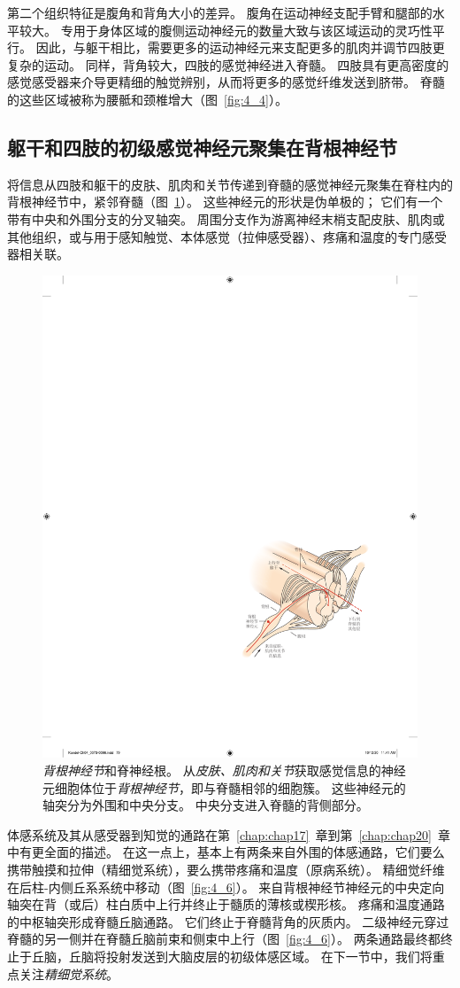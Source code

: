 第二个组织特征是腹角和背角大小的差异。
腹角在运动神经支配手臂和腿部的水平较大。
专用于身体区域的腹侧运动神经元的数量大致与该区域运动的灵巧性平行。
因此，与躯干相比，需要更多的运动神经元来支配更多的肌肉并调节四肢更复杂的运动。
同样，背角较大，四肢的感觉神经进入脊髓。
四肢具有更高密度的感觉感受器来介导更精细的触觉辨别，从而将更多的感觉纤维发送到脐带。
脊髓的这些区域被称为腰骶和颈椎增大（图~\ref{fig:4_4}）。



\subsection{躯干和四肢的初级感觉神经元聚集在背根神经节}

将信息从四肢和躯干的皮肤、肌肉和关节传递到脊髓的感觉神经元聚集在脊柱内的背根神经节中，紧邻脊髓（图~\ref{fig:4_5}）。 
这些神经元的形状是伪单极的；
它们有一个带有中央和外围分支的分叉轴突。
周围分支作为游离神经末梢支配皮肤、肌肉或其他组织，或与用于感知触觉、本体感觉（拉伸感受器）、疼痛和温度的专门感受器相关联。


\begin{figure}[htbp]
	\centering
	\includegraphics[width=0.55\linewidth]{chap04/fig_4_5}
	\caption{\textit{背根神经节}和脊神经根。
		从\textit{皮肤、肌肉和关节}获取感觉信息的神经元细胞体位于\textit{背根神经节}，即与脊髓相邻的细胞簇。
		这些神经元的轴突分为外围和中央分支。 
		中央分支进入脊髓的背侧部分。}
	\label{fig:4_5}
\end{figure}


体感系统及其从感受器到知觉的通路在第~\ref{chap:chap17}~章到第~\ref{chap:chap20}~章中有更全面的描述。
在这一点上，基本上有两条来自外围的体感通路，它们要么携带触摸和拉伸（精细觉系统），要么携带疼痛和温度（原病系统）。
精细觉纤维在后柱-内侧丘系系统中移动（图~\ref{fig:4_6}）。
来自背根神经节神经元的中央定向轴突在背（或后）柱白质中上行并终止于髓质的薄核或楔形核。
疼痛和温度通路的中枢轴突形成脊髓丘脑通路。
它们终止于脊髓背角的灰质内。
二级神经元穿过脊髓的另一侧并在脊髓丘脑前束和侧束中上行（图~\ref{fig:4_6}）。 
两条通路最终都终止于丘脑，丘脑将投射发送到大脑皮层的初级体感区域。
在下一节中，我们将重点关注\textit{精细觉系统}。



